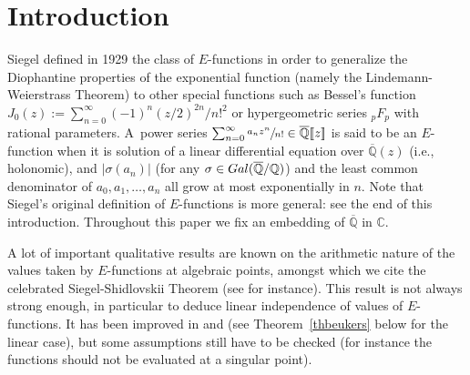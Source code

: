 \documentclass[11pt]{article}
\numberwithin{equation}{section}
\newcommand{\lcr}{[\![}
\newcommand{\rcr}{]\!]}
\newcommand{\Efunction}{$E$\nobreakdash-func\-tion\xspace}
\newcommand{\Efunctions}{$E$\nobreakdash-func\-tions\xspace}
\theoremstyle{definition}
\newcommand{\Q}{\mathbb{Q}}
\newcommand{\C}{\mathbb{C}}
\newcommand{\Qbar}{\overline{\mathbb Q}}
\begin{document}

\section{Introduction}
Siegel \cite{siegel} defined in 1929 the class of \Efunctions in order to generalize the Diophantine properties of the exponential function (namely the Lindemann-Weierstrass Theorem) to other special functions such as Bessel's function $J_0(z):=\sum_{n=0}^\infty (-1)^n(z/2)^{2n}/n!^2$ or hypergeometric series ${}_pF_p$ with rational parameters.
A~power series $\sum_{n=0}^\infty \sfrac{a_nz^n}{n!}  \in \Qbar\lcr z\rcr$ is said to be an \Efunction when it is solution of a linear differential equation over $\Qbar(z)$ (i.e., holonomic),
and $\vert \sigma(a_n)\vert$ (for any $\sigma\in \textup{Gal}(\Qbar/\Q)$) and the least common denominator of $a_0, a_1, \ldots, a_n$ all grow at most exponentially in $n$. Note that Siegel's original definition of \Efunctions is more general: see the end of this introduction.
Throughout this paper we fix an embedding of $\Qbar $ in $\C$.

A lot of important qualitative results are known on the arithmetic nature of the values taken by \Efunctions at algebraic points, amongst which we cite the celebrated Siegel-Shidlovskii Theorem (see \cite{Shidlovskiilivre} for instance). This result is not always strong enough, in particular to deduce linear independence of values of \Efunctions. It has been improved in \cite{ns} and \cite{beukers} (see Theorem~\ref{thbeukers} below for the linear case), but some assump\-tions still have to be checked (for instance the functions should not be
evaluated at a singular point).
\end{document}
